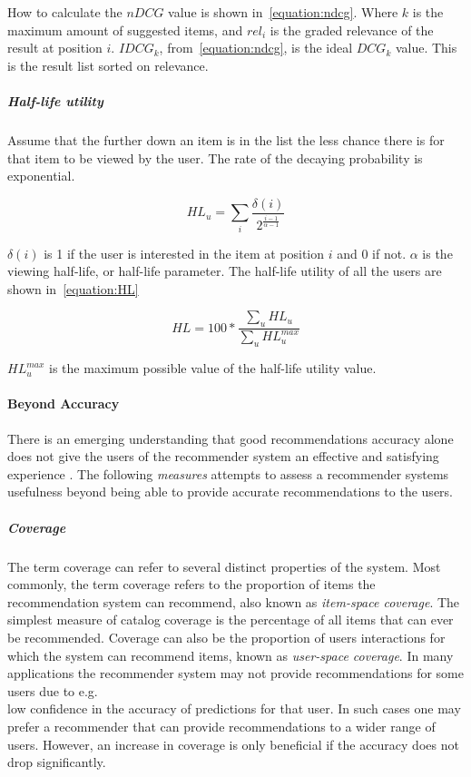 How to calculate the $nDCG$ value is shown in~\ref{equation:ndcg}.  Where $k$
is the maximum amount of suggested items, and $rel_i$ is the graded relevance
of the result at position $i$.  $IDCG_k$, from~\ref{equation:ndcg}, is the
ideal $DCG_k$ value.  This is the result list sorted on relevance.

\subparagraph{Half-life utility~\cite{Breese:1998:EAP:2074094.2074100}}

Assume that the further down an item is in the list the less chance there is
for that item to be viewed by the user.  The rate of the decaying probability
is exponential.

\begin{equation}
	HL_u = \sum_{i}{\frac{\delta(i)}{2^{\frac{i-1}{\alpha-1}}}}
\end{equation}

$\delta(i)$ is 1 if the user is interested in the item at position $i$ and 0 if
not.  $\alpha$ is the viewing half-life, or half-life parameter.  The half-life
utility of all the users are shown in~\ref{equation:HL}

\begin{equation}
	HL = 100 * \frac{\sum_u{HL_u}}{\sum_u{HL_u^{max}}}
	\label{equation:HL}
\end{equation}

$HL_u^{max}$ is the maximum possible value of the half-life utility value.


\paragraph{Beyond Accuracy}
There is an emerging understanding that good recommendations accuracy alone
does not give the users of the recommender system an effective and satisfying
experience \cite{Herlocker2004}. The following \emph{measures} attempts to
assess a recommender systems usefulness beyond being able to provide accurate
recommendations to the users.

\subparagraph{Coverage}
The term coverage can refer to several distinct properties of the system. Most
commonly, the term coverage refers to the proportion of items the
recommendation system can recommend, also known as \emph{item-space coverage}.
The simplest measure of catalog coverage is the percentage of all items that
can ever be recommended. Coverage can also be the proportion of users
interactions for which the system can recommend items, known as
\emph{user-space coverage}. In many applications the recommender system may not
provide recommendations for some users due to e.g.\\ low confidence in the
accuracy of predictions for that user. In such cases one may prefer a
recommender that can provide recommendations to a wider range of users.
However, an increase in coverage is only beneficial if the accuracy does not
drop significantly.


